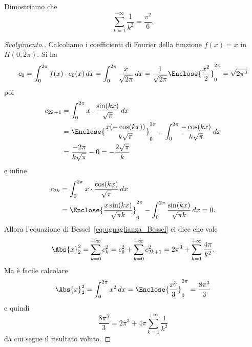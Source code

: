 \begin{exercise}
\label{ex:Basilea}%
Dimostriamo che
\begin{equation}\label{eq:basilea}
  \sum_{k=1}^{+\infty} \frac{1}{k^2} = \frac{\pi^2}{6}.
\end{equation}
\end{exercise}
\begin{proof}[Svolgimento.]
Calcoliamo i coefficienti di Fourier della funzione $f(x)=x$ in $H(0,2\pi)$.
Si ha
\[
 c_0 = \int_0^{2\pi} f(x)\cdot e_0(x)\, dx = \int_0^{2\pi} \frac{x}{\sqrt{2\pi}}\, dx = \frac{1}{\sqrt{2\pi}}\Enclose{\frac{x^2}{2}}_0^{2\pi}
  = \sqrt{2\pi^3}
\]
poi
\begin{align*}
  c_{2k+1} &= \int_0^{2\pi} x \cdot \frac{\sin(kx)}{\sqrt \pi}\, dx \\
   &= \Enclose{\frac{x(-\cos(kx))}{k\sqrt \pi}}_0^{2\pi}
   - \int_0^{2\pi} \frac{-\cos(kx)}{k\sqrt \pi}\, dx\\
   &= \frac{-2\pi}{k\sqrt \pi} - 0 = -\frac{2\sqrt \pi}{k}
\end{align*}
e infine
\begin{align*}
  c_{2k} &= \int_0^{2\pi} x \cdot \frac{\cos (kx)}{\sqrt \pi}\, dx \\
  &= \Enclose{\frac{x \sin(kx)}{\sqrt \pi k}}_0^{2\pi}
  - \int_0^{2\pi} \frac{\sin(kx)}{\sqrt \pi k}\, dx
  = 0.
\end{align*}
Allora l'equazione di Bessel~\eqref{eq:uguaglianza_Bessel} ci dice
che vale
\[
  \Abs{x}_2^2 = \sum_{k=0}^{+\infty} c_k^2
  = c_0^2 + \sum_{k=0}^{+\infty} c_{2k+1}^2
  = 2\pi^3 + \sum_{k=1}^{+\infty} \frac{4\pi}{k^2}.
\]
Ma è facile calcolare
\[
 \Abs{x}_2^2 = \int_0^{2\pi} x^2\, dx = \Enclose{\frac{x^3}{3}}_0^{2\pi}
  = \frac{8\pi^3}{3}
\]
e quindi
\[
  \frac{8\pi^3}{3} = 2\pi^3 + 4\pi \sum_{k=1}^{+\infty}\frac{1}{k^2}
\]
da cui segue il risultato voluto.
\end{proof}

